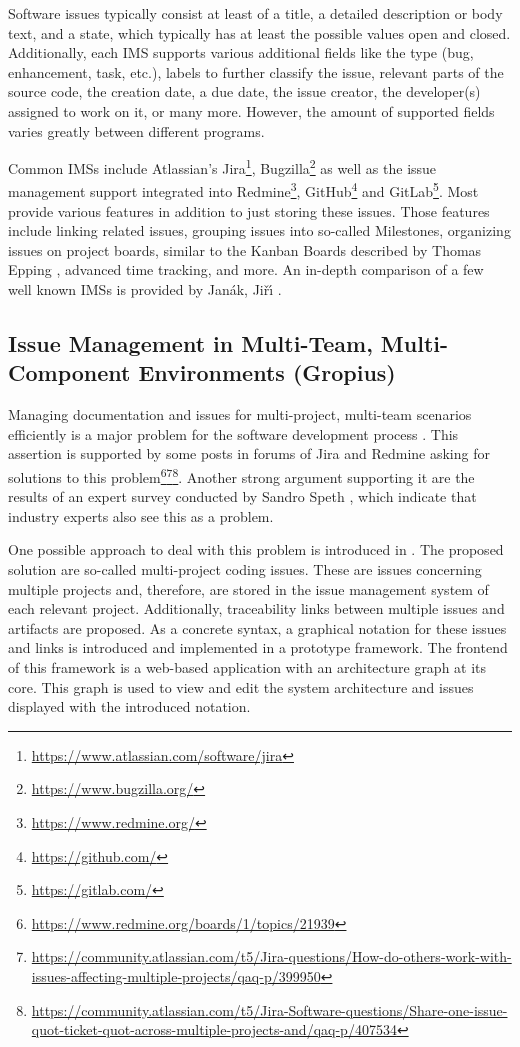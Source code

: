 Software issues typically consist at least of a title, a detailed description or body text, and a state, 
which typically has at least the possible values open and closed.
Additionally, each \gls{IMS} supports various additional fields like the type (bug, enhancement, task, etc.), 
labels to further classify the issue, relevant parts of the source code, the creation date, a due date, the issue creator, the developer(s) assigned to work on it, or many more.
However, the amount of supported fields varies greatly between different programs.

Common \glspl{IMS} include Atlassian's Jira\footnote{\url{https://www.atlassian.com/software/jira}}, 
Bugzilla\footnote{\url{https://www.bugzilla.org/}} 
as well as the issue management support integrated into Redmine\footnote{\url{https://www.redmine.org/}}, 
GitHub\footnote{\url{https://github.com/}} and 
GitLab\footnote{\url{https://gitlab.com/}}.
Most provide various features in addition to just storing these issues. 
Those features include linking related issues, grouping issues into so-called Milestones, organizing issues on project boards, similar to the Kanban Boards described by Thomas Epping \cite{epping2011kanban}, advanced time tracking, and more.
An in-depth comparison of a few well known \glspl{IMS} is provided by Jan{\'a}k, Ji{\v{r}}{\'\i} \cite{janak2009issue}. 

\subsection{Issue Management in Multi-Team, Multi-Component Environments (Gropius)}
\label{ssec:ch2:ss1.2}
Managing documentation and issues for multi-project, multi-team scenarios efficiently is a major problem for the software development process  \cite{mahmood2015identifying}. This assertion is supported by some posts in forums of Jira and Redmine asking for solutions to this problem\footnote{\url{https://www.redmine.org/boards/1/topics/21939}}\footnote{\url{https://community.atlassian.com/t5/Jira-questions/How-do-others-work-with-issues-affecting-multiple-projects/qaq-p/399950}}\footnote{\url{https://community.atlassian.com/t5/Jira-Software-questions/Share-one-issue-quot-ticket-quot-across-multiple-projects-and/qaq-p/407534}}. Another strong argument supporting it are the results of an expert survey conducted by Sandro Speth \cite{Speth2019}, which indicate that industry experts also see this as a problem.

One possible approach to deal with this problem is introduced in \cite{Speth2019}.
The proposed solution are so-called multi-project coding issues. These are issues concerning multiple projects and, therefore, are stored in the issue management system of each relevant project. Additionally, traceability links between multiple issues and artifacts are proposed. As a concrete syntax, a graphical notation for these issues and links is introduced and implemented in a prototype framework. The frontend of this framework is a web-based application with an architecture graph at its core.
This graph is used to view and edit the system architecture and issues displayed with the introduced notation. 

